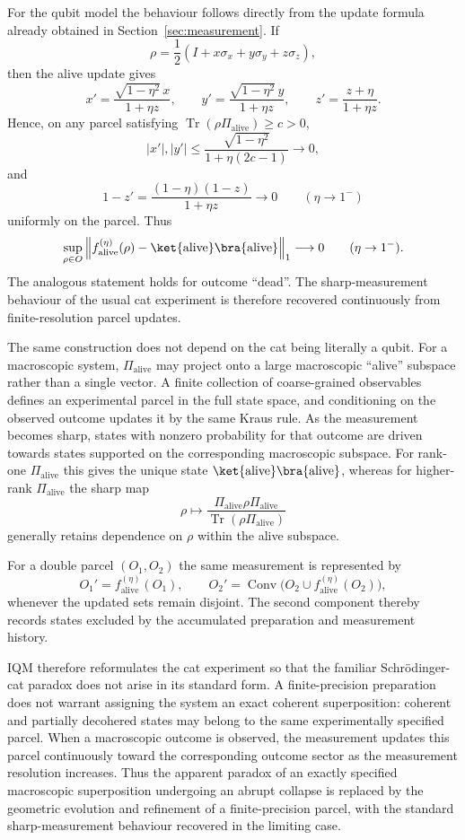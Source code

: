 \documentclass[11pt, onecolumn]{article}
\begin{document}
For the qubit model the behaviour follows directly from the update formula
already obtained in Section~\ref{sec:measurement}.  If
\[
\rho=\frac12(I+x\sigma_x+y\sigma_y+z\sigma_z),
\]
then the alive update gives
\[
x'
=
\frac{\sqrt{1-\eta^2}\,x}{1+\eta z},
\qquad
y'
=
\frac{\sqrt{1-\eta^2}\,y}{1+\eta z},
\qquad
z'
=
\frac{z+\eta}{1+\eta z}.
\]
Hence, on any parcel satisfying
$\operatorname{Tr}(\rho\Pi_{\text{alive}})\ge c>0$,
\[
|x'|,|y'|
\le
\frac{\sqrt{1-\eta^2}}
     {1+\eta(2c-1)}
\longrightarrow0,
\]
and
\[
1-z'
=
\frac{(1-\eta)(1-z)}
     {1+\eta z}
\longrightarrow0
\qquad(\eta\to1^-)
\]
uniformly on the parcel.  Thus
\[
\sup_{\rho\in O}
\left\|
f_{\text{alive}}^{(\eta)}(\rho)
-
\ket{\text{alive}}\bra{\text{alive}}
\right\|_1
\longrightarrow0
\qquad(\eta\to1^-).
\]
The analogous statement holds for outcome ``dead''.  The sharp-measurement behaviour of the usual cat
experiment is therefore recovered continuously from finite-resolution
parcel updates.

The same construction does not depend on the cat being literally a qubit.
For a macroscopic system, $\Pi_{\text{alive}}$ may project onto a large
macroscopic ``alive'' subspace rather than a single vector. A finite
collection of coarse-grained observables defines an experimental parcel in
the full state space, and conditioning on the observed outcome updates it
by the same Kraus rule. As the measurement becomes sharp, states with
nonzero probability for that outcome are driven towards states supported
on the corresponding macroscopic subspace. For rank-one $\Pi_{\text{alive}}$
this gives the unique state $\ket{\text{alive}}\bra{\text{alive}}$, whereas
for higher-rank $\Pi_{\text{alive}}$ the sharp map
\[
\rho\mapsto
\frac{\Pi_{\text{alive}}\rho\Pi_{\text{alive}}}
{\operatorname{Tr}(\rho\Pi_{\text{alive}})}
\]
generally retains dependence on $\rho$ within the alive subspace.

For a double parcel $(O_1,O_2)$ the same measurement is represented by
\[
O_1'=f_{\text{alive}}^{(\eta)}(O_1),
\qquad
O_2'
=
\operatorname{Conv}
\bigl(O_2\cup f_{\text{alive}}^{(\eta)}(O_2)\bigr),
\]
whenever the updated sets remain disjoint. The second component thereby
records states excluded by the accumulated preparation and measurement
history.

IQM therefore reformulates the cat experiment so that the familiar
Schr\"odinger-cat paradox does not arise in its standard form. A
finite-precision preparation does not warrant assigning the system an
exact coherent superposition: coherent and partially decohered states may
belong to the same experimentally specified parcel. When a macroscopic
outcome is observed, the measurement updates this parcel continuously
toward the corresponding outcome sector as the measurement resolution
increases. Thus the apparent paradox of an exactly specified macroscopic
superposition undergoing an abrupt collapse is replaced by the geometric
evolution and refinement of a finite-precision parcel, with the standard
sharp-measurement behaviour recovered in the limiting case.
\end{document}
